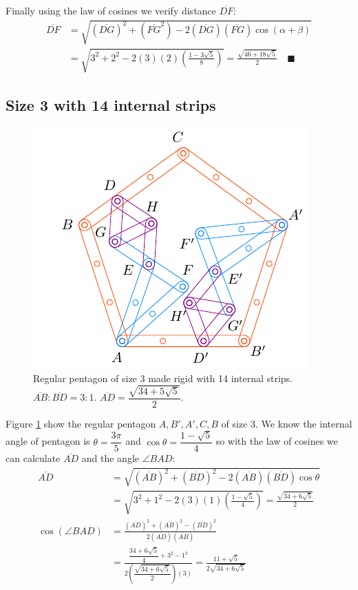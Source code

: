 \documentclass[11pt]{article}
\begin{document}
Finally using the law of cosines we verify distance $\overline{DF}$:
\begin{align}
\overline{DF} &= \sqrt{(\overline{DG})^2 + (\overline{FG}^2)
 - 2(\overline{DG})(\overline{FG})\cos(\alpha+\beta)} \nonumber\\
 &= \sqrt{3^2 + 2^2 - 2(3)(2)\left(\frac{1 - 3\sqrt5}8\right)}
 = \frac{\sqrt{46+18\sqrt5}}2 \quad\blacksquare
\end{align}

\subsection{Size 3 with 14 internal strips}

\begin{figure}[H]
\centering
\includegraphics[scale=1.2]{3/penta3-14a}
\caption{Regular pentagon of size 3 made rigid with 14 internal strips. $\overline{AB}:\overline{BD} = 3:1$. $\overline{AD} = \dfrac{\sqrt{34+5\sqrt5}}2$.}
\label{fig:penta3-14a}
\end{figure}

Figure \ref{fig:penta3-14a} show the regular pentagon $A,B',A',C,B$ of size $3$. We know the internal angle of pentagon is $\theta=\dfrac{3\pi}5$ and $\cos\theta=\dfrac{1-\sqrt5}4$ so with the law of cosines we can calculate $\overline{AD}$ and the angle $\angle{BAD}$:
\begin{align}
\overline{AD} &= \sqrt{(\overline{AB})^2 + (\overline{BD})^2
 - 2(\overline{AB})(\overline{BD})\cos\theta} \nonumber\\
 &= \sqrt{3^2 + 1^2 - 2(3)(1)\left(\frac{1-\sqrt5}4\right)} = \frac{\sqrt{34+6\sqrt5}}2\\
\cos(\angle{BAD}) &= \frac{(\overline{AD})^2 + (\overline{AB})^2 - (\overline{BD})^2}
 {2(\overline{AD})(\overline{AB})} \nonumber\\
 &= \frac{\dfrac{34+6\sqrt5}4 + 3^2 - 1^2}{2\left(\dfrac{\sqrt{34+6\sqrt5}}2\right)(3)}
  = \frac{11+\sqrt5}{2\sqrt{34+6\sqrt5}}
\end{align}
\end{document}
